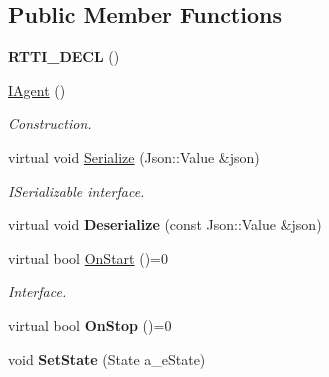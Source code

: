 \subsection*{Public Member Functions}
\begin{DoxyCompactItemize}
\item 
\mbox{\label{class_i_agent_af511e4b0c62eb4701911ce387fc6d8d2}} 
{\bfseries R\+T\+T\+I\+\_\+\+D\+E\+CL} ()
\item 
\mbox{\label{class_i_agent_a4ef6a127f3eca899f021cf138db09bad}} 
\hyperlink{class_i_agent_a4ef6a127f3eca899f021cf138db09bad}{I\+Agent} ()
\begin{DoxyCompactList}\small\item\em Construction. \end{DoxyCompactList}\item 
\mbox{\label{class_i_agent_a5aa109135dbd669f8384cc73a54e8767}} 
virtual void \hyperlink{class_i_agent_a5aa109135dbd669f8384cc73a54e8767}{Serialize} (Json\+::\+Value \&json)
\begin{DoxyCompactList}\small\item\em I\+Serializable interface. \end{DoxyCompactList}\item 
\mbox{\label{class_i_agent_a3d22d33e81fb5257170013277ef59613}} 
virtual void {\bfseries Deserialize} (const Json\+::\+Value \&json)
\item 
\mbox{\label{class_i_agent_a176389a45e19affdd1b8be5c6c981120}} 
virtual bool \hyperlink{class_i_agent_a176389a45e19affdd1b8be5c6c981120}{On\+Start} ()=0
\begin{DoxyCompactList}\small\item\em Interface. \end{DoxyCompactList}\item 
\mbox{\label{class_i_agent_a0de8756c1035a1a905cb09b19d4bf164}} 
virtual bool {\bfseries On\+Stop} ()=0
\item 
\mbox{\label{class_i_agent_ab3935ad94d9672ca2f980868c089d04f}} 
void {\bfseries Set\+State} (State a\+\_\+e\+State)
\item 
\mbox{\label{class_i_agent_ad210876d1cedf15d7bfdd94cb6d9842b}} 

\end{DoxyCompactItemize}
